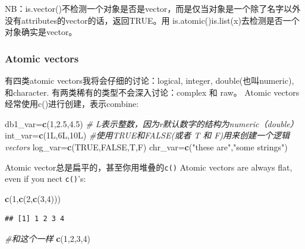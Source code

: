 \documentclass[
]{book}
\newenvironment{Shaded}{\begin{snugshade}}{\end{snugshade}}
\newcommand{\CommentTok}[1]{\textcolor[rgb]{0.56,0.35,0.01}{\textit{#1}}}
\newcommand{\DecValTok}[1]{\textcolor[rgb]{0.00,0.00,0.81}{#1}}
\newcommand{\FloatTok}[1]{\textcolor[rgb]{0.00,0.00,0.81}{#1}}
\newcommand{\KeywordTok}[1]{\textcolor[rgb]{0.13,0.29,0.53}{\textbf{#1}}}
\newcommand{\NormalTok}[1]{#1}
\newcommand{\OtherTok}[1]{\textcolor[rgb]{0.56,0.35,0.01}{#1}}
\newcommand{\StringTok}[1]{\textcolor[rgb]{0.31,0.60,0.02}{#1}}
\theoremstyle{definition}
\theoremstyle{definition}
\theoremstyle{definition}
\theoremstyle{remark}
\begin{document}
NB：is.vector()不检测一个对象是否是vector，而是仅当对象是一个除了名字以外没有attributes的vector的话，返回TRUE。用 is.atomic()\textbar\textbar is.list(x)去检测是否一个对象确实是vector。

\hypertarget{atomic-vectors}{%
\subsubsection{Atomic vectors}\label{atomic-vectors}}

有四类atomic vectors我将会仔细的讨论：logical, integer, double(也叫numeric), 和character. 有两类稀有的类型不会深入讨论：complex 和 raw。
Atomic vectors经常使用c()进行创建，表示combine:

\begin{Shaded}
\begin{Highlighting}[]
\NormalTok{db1_var=}\KeywordTok{c}\NormalTok{(}\DecValTok{1}\NormalTok{,}\FloatTok{2.5}\NormalTok{,}\FloatTok{4.5}\NormalTok{)}
\CommentTok{# L表示整数，因为r默认数字的结构为numeric（double）}
\NormalTok{int_var=}\KeywordTok{c}\NormalTok{(1L,6L,10L)}
\CommentTok{#使用TRUE和FALSE(或者 T 和 F)用来创建一个逻辑vectors}
\NormalTok{log_var=}\KeywordTok{c}\NormalTok{(}\OtherTok{TRUE}\NormalTok{,}\OtherTok{FALSE}\NormalTok{,T,F)}
\NormalTok{chr_var=}\KeywordTok{c}\NormalTok{(}\StringTok{"these are"}\NormalTok{,}\StringTok{"some strings"}\NormalTok{)}
\end{Highlighting}
\end{Shaded}

Atomic vector总是扁平的，甚至你用堆叠的\texttt{c()}
Atomic vectors are always flat, even if you nect \texttt{c()}'s:

\begin{Shaded}
\begin{Highlighting}[]
\KeywordTok{c}\NormalTok{(}\DecValTok{1}\NormalTok{,}\KeywordTok{c}\NormalTok{(}\DecValTok{2}\NormalTok{,}\KeywordTok{c}\NormalTok{(}\DecValTok{3}\NormalTok{,}\DecValTok{4}\NormalTok{)))}
\end{Highlighting}
\end{Shaded}

\begin{verbatim}
## [1] 1 2 3 4
\end{verbatim}

\begin{Shaded}
\begin{Highlighting}[]
\CommentTok{#和这个一样}
\KeywordTok{c}\NormalTok{(}\DecValTok{1}\NormalTok{,}\DecValTok{2}\NormalTok{,}\DecValTok{3}\NormalTok{,}\DecValTok{4}\NormalTok{)}
\end{Highlighting}
\end{Shaded}
\end{document}
